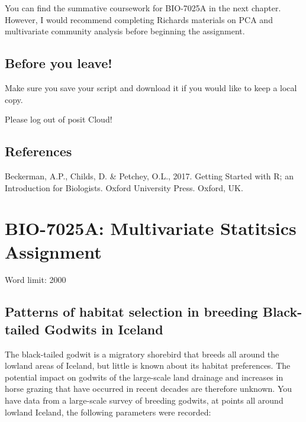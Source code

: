 \documentclass[
]{book}
\begin{document}
You can find the summative coursework for BIO-7025A in the next chapter. However, I would recommend completing Richards materials on PCA and multivariate community analysis before beginning the assignment.

\hypertarget{before-you-leave-11}{%
\section{Before you leave!}\label{before-you-leave-11}}

Make sure you save your script and download it if you would like to keep a local copy.

Please log out of posit Cloud!

\hypertarget{references-7}{%
\section{References}\label{references-7}}

Beckerman, A.P., Childs, D. \& Petchey, O.L., 2017. Getting Started with R; an Introduction for Biologists. Oxford University Press. Oxford, UK.

\hypertarget{bio-7025a-multivariate-statitsics-assignment}{%
\chapter{BIO-7025A: Multivariate Statitsics Assignment}\label{bio-7025a-multivariate-statitsics-assignment}}

Word limit: 2000

\hypertarget{patterns-of-habitat-selection-in-breeding-black-tailed-godwits-in-iceland}{%
\section{Patterns of habitat selection in breeding Black-tailed Godwits in Iceland}\label{patterns-of-habitat-selection-in-breeding-black-tailed-godwits-in-iceland}}

The black-tailed godwit is a migratory shorebird that breeds all around the lowland areas of Iceland, but little is known about its habitat preferences. The potential impact on godwits of the large-scale land drainage and increases in horse grazing that have occurred in recent decades are therefore unknown. You have data from a large-scale survey of breeding godwits, at points all around lowland Iceland, the following parameters were recorded:
\end{document}
